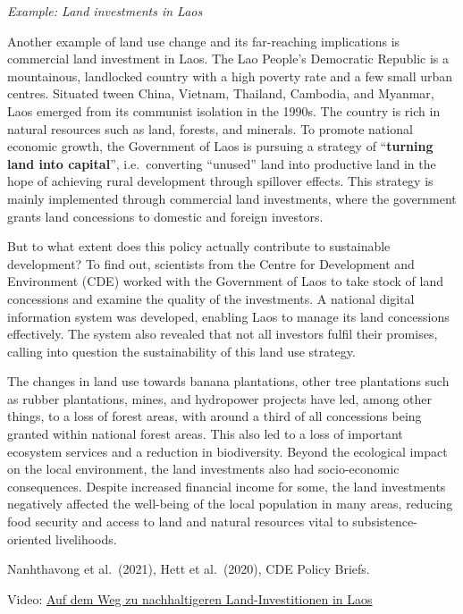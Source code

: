 \documentclass[
  a4paper,
  openany]{book}
\begin{document}
\begin{tcolorbox}[enhanced jigsaw, left=2mm, arc=.35mm, titlerule=0mm, opacityback=0, leftrule=.75mm, title={Tip}, breakable, bottomtitle=1mm, rightrule=.15mm, coltitle=black, toptitle=1mm, bottomrule=.15mm, colback=white, opacitybacktitle=0.6, colbacktitle=quarto-callout-tip-color!10!white, toprule=.15mm, colframe=quarto-callout-tip-color-frame]

\emph{Example: Land investments in Laos}

Another example of land use change and its far-reaching implications is
commercial land investment in Laos. The Lao People's Democratic Republic
is a mountainous, landlocked country with a high poverty rate and a few
small urban centres. Situated tween China, Vietnam, Thailand, Cambodia,
and Myanmar, Laos emerged from its communist isolation in the 1990s. The
country is rich in natural resources such as land, forests, and
minerals. To promote national economic growth, the Government of Laos is
pursuing a strategy of ``\textbf{turning land into capital}'',
i.e.~converting ``unused'' land into productive land in the hope of
achieving rural development through spillover effects. This strategy is
mainly implemented through commercial land investments, where the
government grants land concessions to domestic and foreign investors.

But to what extent does this policy actually contribute to sustainable
development? To find out, scientists from the Centre for Development and
Environment (CDE) worked with the Government of Laos to take stock of
land concessions and examine the quality of the investments. A national
digital information system was developed, enabling Laos to manage its
land concessions effectively. The system also revealed that not all
investors fulfil their promises, calling into question the
sustainability of this land use strategy.

The changes in land use towards banana plantations, other tree
plantations such as rubber plantations, mines, and hydropower projects
have led, among other things, to a loss of forest areas, with around a
third of all concessions being granted within national forest areas.
This also led to a loss of important ecosystem services and a reduction
in biodiversity. Beyond the ecological impact on the local environment,
the land investments also had socio-economic consequences. Despite
increased financial income for some, the land investments negatively
affected the well-being of the local population in many areas, reducing
food security and access to land and natural resources vital to
subsistence-oriented livelihoods.

Nanhthavong et al.~(2021), Hett et al.~(2020), CDE Policy Briefs.~

Video: \href{https://www.youtube.com/watch?v=bjogk0f99Lc}{Auf dem Weg zu
nachhaltigeren Land-Investitionen in Laos}

\end{tcolorbox}
\end{document}
